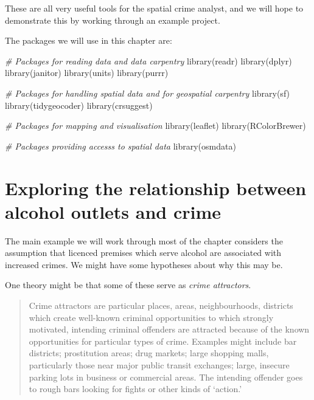 \documentclass[
]{book}
\makeatletter
\newenvironment{Shaded}{\begin{snugshade}}{\end{snugshade}}
\newcommand{\CommentTok}[1]{\textcolor[rgb]{0.37,0.37,0.37}{\textit{#1}}}
\newcommand{\FunctionTok}[1]{\textcolor[rgb]{0,0,0}{#1}}
\newcommand{\NormalTok}[1]{#1}
\newenvironment{kframe}{%
\medskip{}
\setlength{\fboxsep}{.8em}
 \def\at@end@of@kframe{}%
 \ifinner\ifhmode%
  \def\at@end@of@kframe{\end{minipage}}%
  \begin{minipage}{\columnwidth}%
 \fi\fi%
 \def\FrameCommand##1{\hskip\@totalleftmargin \hskip-\fboxsep
 \colorbox{shadecolor}{##1}\hskip-\fboxsep
     \hskip-\linewidth \hskip-\@totalleftmargin \hskip\columnwidth}%
 \MakeFramed {\advance\hsize-\width
   \@totalleftmargin\z@ \linewidth\hsize
   \@setminipage}}%
 {\par\unskip\endMakeFramed%
 \at@end@of@kframe}
\renewenvironment{Shaded}{\begin{kframe}}{\end{kframe}}
\makeatother
\begin{document}
These are all very useful tools for the spatial crime analyst, and we will hope to demonstrate this by working through an example project.

The packages we will use in this chapter are:

\begin{Shaded}
\begin{Highlighting}[]
\CommentTok{\# Packages for reading data and data carpentry}
\FunctionTok{library}\NormalTok{(readr)}
\FunctionTok{library}\NormalTok{(dplyr)}
\FunctionTok{library}\NormalTok{(janitor)}
\FunctionTok{library}\NormalTok{(units)}
\FunctionTok{library}\NormalTok{(purrr)}

\CommentTok{\# Packages for handling spatial data and for geospatial carpentry}
\FunctionTok{library}\NormalTok{(sf)}
\FunctionTok{library}\NormalTok{(tidygeocoder)}
\FunctionTok{library}\NormalTok{(crsuggest)}

\CommentTok{\# Packages for mapping and visualisation}
\FunctionTok{library}\NormalTok{(leaflet)}
\FunctionTok{library}\NormalTok{(RColorBrewer)}

\CommentTok{\# Packages providing accesss to spatial data}
\FunctionTok{library}\NormalTok{(osmdata)}
\end{Highlighting}
\end{Shaded}

\hypertarget{exploring-the-relationship-between-alcohol-outlets-and-crime}{%
\section{Exploring the relationship between alcohol outlets and crime}\label{exploring-the-relationship-between-alcohol-outlets-and-crime}}

The main example we will work through most of the chapter considers the assumption that licenced premises which serve alcohol are associated with increased crimes. We might have some hypotheses about why this may be.

One theory might be that some of these serve as \emph{crime attractors}.

\begin{quote}
Crime attractors are particular places, areas, neighbourhoods, districts which create well-known criminal opportunities to which strongly motivated, intending criminal offenders are attracted because of the known opportunities for particular types of crime. Examples might include bar districts; prostitution areas; drug markets; large shopping malls, particularly those near major public transit exchanges; large, insecure parking lots in business or commercial areas. The intending offender goes to rough bars looking for fights or other kinds of `action.'
\end{quote}
\end{document}
